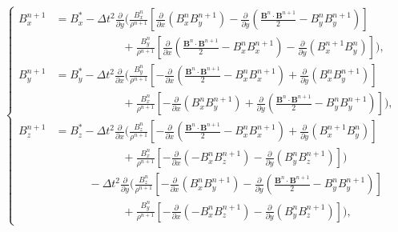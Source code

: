 \documentclass[a4paper,fleqn]{cas-sc}
\theoremstyle{definition}
\theoremstyle{remark}
\begin{document}
\begin{equation}
    \label{equ:mag-sub}
    \left\{ 
    \begin{aligned}
    B_x^{n+1} &= B_x ^ * - \Delta t^2 \frac{\partial}{\partial y} (\frac{B_x^n}{\rho^{n+1}} [\frac{\partial}{\partial x} (B_x^n B_y^{n+1}) -  \frac{\partial}{\partial y} (\frac{\mathbf{B}^n \cdot \mathbf{B}^{n+1}}{2} - B_y^n B_y^{n+1}) ] \\
    & \quad \quad \quad \quad \quad\quad + \frac{B_y^n}{\rho^{n+1}} [\frac{\partial}{\partial x} (\frac{\mathbf{B}^n \cdot \mathbf{B}^{n+1}}{2} - B_x^n B_x^{n+1}) -  \frac{\partial}{\partial y} ( B_x^{n+1} B_y^{n}) ]),\\
    B_y^{n+1} &= B_y^* - \Delta t^2 \frac{\partial}{\partial x} (\frac{B_y^n}{\rho^{n+1}} [-\frac{\partial}{\partial x} (\frac{\mathbf{B}^n \cdot \mathbf{B}^{n+1}}{2} - B_x^n B_x^{n+1} ) +  \frac{\partial}{\partial y}(B_x^{n} B_y^{n+1})]\\
    & \quad \quad \quad \quad \quad\quad + \frac{B_x^n}{\rho^{n+1}} [- \frac{\partial}{\partial x} (B_x^{n} B_y^{n+1} ) +  \frac{\partial}{\partial y}(\frac{\mathbf{B}^n \cdot \mathbf{B}^{n+1}}{2} - B_y^n B_y^{n+1})]),\\
    B_z^{n+1} &= B_z^* -\Delta t^2 \frac{\partial}{\partial x}(\frac{B_z^n}{\rho^{n+1}}[- \frac{\partial}{\partial x}(\frac{\mathbf{B}^n \cdot \mathbf{B}^{n + 1}}{2} - B_x^n B_x^{n+1}) +  \frac{\partial}{\partial y}(B_x^{n+1} B^n_y)] \\
    & \quad \quad \quad \quad \quad\quad + \frac{B_x^n}{\rho^{n+1}}[- \frac{\partial}{\partial x}(- B_x^n B_z^{n+1}) -  \frac{\partial}{\partial y}(B_y^{n} B_z^{n+1})]) \\
    & \quad \quad \quad -\Delta t^2 \frac{\partial}{\partial y}(\frac{B_z^n}{\rho^{n+1}}[-\frac{\partial}{\partial x}(B_x^n B_y^{n+1}) - \frac{\partial}{\partial y}(\frac{\mathbf{B}^n \cdot \mathbf{B}^{n + 1}}{2} - B_y^n B_y^{n+1})] \\
    & \quad \quad \quad \quad \quad\quad + \frac{B_y^n}{\rho^{n+1}}[-\frac{\partial}{\partial x}(- B_x^n B_z^{n+1}) -  \frac{\partial}{\partial y}(B_y^{n} B_z^{n+1})]),
    \end{aligned}
    \right.
\end{equation}
\end{document}
